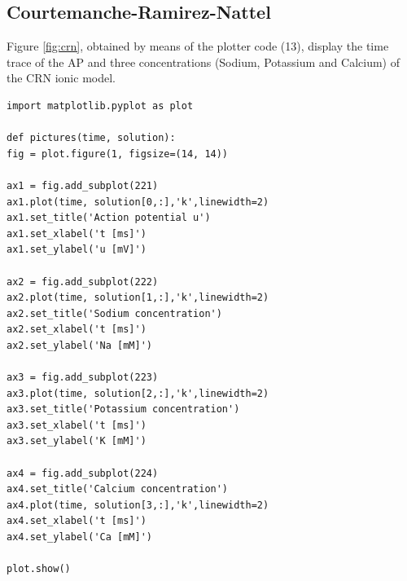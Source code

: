 \documentclass[11pt,a4paper]{article}
\begin{document}
\subsection{Courtemanche-Ramirez-Nattel}\label{sec:results_ap}
Figure \ref{fig:crn}, obtained by means of the plotter code (13), display the time trace of the AP and three concentrations (Sodium, Potassium and Calcium) of the CRN ionic model.  

\lstset{language=Python}
\lstset{frame=lines}
\lstset{basicstyle=\footnotesize}
\begin{lstlisting}
import matplotlib.pyplot as plot  

def pictures(time, solution):
fig = plot.figure(1, figsize=(14, 14))

ax1 = fig.add_subplot(221)
ax1.plot(time, solution[0,:],'k',linewidth=2)
ax1.set_title('Action potential u')
ax1.set_xlabel('t [ms]')
ax1.set_ylabel('u [mV]')

ax2 = fig.add_subplot(222)
ax2.plot(time, solution[1,:],'k',linewidth=2)
ax2.set_title('Sodium concentration')
ax2.set_xlabel('t [ms]')
ax2.set_ylabel('Na [mM]')

ax3 = fig.add_subplot(223)
ax3.plot(time, solution[2,:],'k',linewidth=2)
ax3.set_title('Potassium concentration')
ax3.set_xlabel('t [ms]')
ax3.set_ylabel('K [mM]')

ax4 = fig.add_subplot(224)
ax4.set_title('Calcium concentration')
ax4.plot(time, solution[3,:],'k',linewidth=2)
ax4.set_xlabel('t [ms]')
ax4.set_ylabel('Ca [mM]')

plot.show()
\end{lstlisting}



\end{document}
